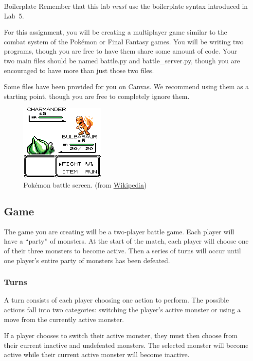 \documentclass[11pt]{cselabheader}
\begin{document}
\begin{warningbox}{Boilerplate}
  Remember that this lab \emph{must} use the
  boilerplate syntax introduced in Lab~5.
\end{warningbox}

For this assignment, you will be creating a multiplayer game similar to the
combat system of the Pok\'emon or Final Fantasy games. You will be writing
two programs, though you are free to have them share some amount of code.
Your two main files should be named battle.py and battle\_server.py, though
you are encouraged to have more than just those two files.

Some files have been provided for you on Canvas. We recommend using them as
a starting point, though you are free to completely ignore them.

\begin{figure}[h]
  \centering
  \includegraphics{img/Bulbasaur_pokemon_red}
  \caption{Pok\'emon battle screen. (from
    \href{http://en.wikipedia.org/wiki/File:Bulbasaur_pokemon_red.png}{Wikipedia})}
  \label{poke}
\end{figure}

\subsection{Game}
The game you are creating will be a two-player battle game. Each player will
have a ``party'' of monsters. At the start of the match, each player will choose
one of their three monsters to become active. Then a series of turns will occur
until one player's entire party of monsters has been defeated.

\subsubsection{Turns}
\label{subsubsec:turn}
A turn consists of each player choosing one action to perform. The possible
actions fall into two categories: switching the player's active monster or using
a move from the currently active monster.

If a player chooses to switch their active monster, they must then choose from
their current inactive and undefeated monsters. The selected monster will become
active while their current active monster will become inactive.
\end{document}
